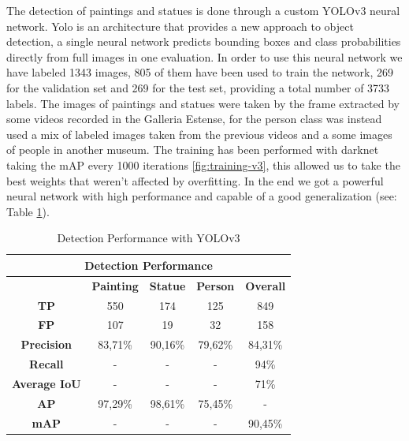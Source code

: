The detection of paintings and statues is done through a custom YOLOv3 neural network.\cite{yolov3}
Yolo is an architecture that provides a new approach to object detection, a single neural network predicts bounding boxes and class probabilities directly from full images in one evaluation.
In order to use this neural network we have labeled 1343 images, 805 of them have been used to train the network, 269 for the validation set and 269 for the test set, providing a total number of 3733 labels. The images of paintings and statues were taken by the frame extracted by some videos recorded in the Galleria Estense, for the person class was instead used a mix of labeled images taken from the previous videos and a some images of people in another museum.
The training has been performed with darknet \cite{darknet} taking the mAP every 1000 iterations \ref{fig:training-v3}, this allowed us to take the best weights that weren't affected by overfitting.
In the end we got a powerful neural network with high performance and capable of a good generalization (see: Table \ref{tab:detection_performance}).

\begin{table}[ht]
    \centering
\begin{tabular}{|c|c|c|c|c|}
\hline
\multicolumn{5}{|c|}{\textbf{Detection Performance}}       \\ \hline
\multicolumn{1}{|l|}{} & \textbf{Painting} & \textbf{Statue} & \textbf{Person} & \textbf{Overall} \\ \hline
\textbf{TP}        & 550     & 174     & 125     & 849     \\ \hline
\textbf{FP}        & 107     & 19      & 32      & 158     \\ \hline
\textbf{Precision} & 83,71\% & 90,16\% & 79,62\% & 84,31\% \\ \hline
\textbf{Recall}    & -       & -       & -       & 94\%    \\ \hline
\textbf{Average IoU}       & -       & -       & -       & 71\%    \\ \hline
\textbf{AP}        & 97,29\% & 98,61\% & 75,45\% & -       \\ \hline
\textbf{mAP}       & -       & -       & -       & 90,45\% \\ \hline
\end{tabular}
\caption{Detection Performance with YOLOv3} 
    \label{tab:detection_performance}
\end{table}



